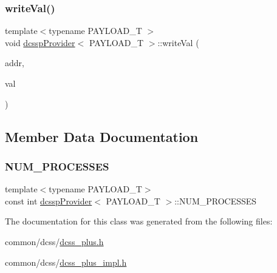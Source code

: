 \subsubsection{\texorpdfstring{write\+Val()}{writeVal()}}
{\footnotesize\ttfamily template$<$typename P\+A\+Y\+L\+O\+A\+D\+\_\+T $>$ \\
void \hyperlink{classdcsspProvider}{dcssp\+Provider}$<$ P\+A\+Y\+L\+O\+A\+D\+\_\+T $>$\+::write\+Val (\begin{DoxyParamCaption}\item[{\hyperlink{rq__unsafe_8h_ad45142aaf2ff20a036dc6242b8483e9c}{casword\+\_\+t} volatile $\ast$}]{addr,  }\item[{\hyperlink{rq__unsafe_8h_ad45142aaf2ff20a036dc6242b8483e9c}{casword\+\_\+t}}]{val }\end{DoxyParamCaption})}



\subsection{Member Data Documentation}
\mbox{\label{classdcsspProvider_a9ac60e159f73cc3e50fd85571b3c39a3}} 
\subsubsection{\texorpdfstring{N\+U\+M\+\_\+\+P\+R\+O\+C\+E\+S\+S\+ES}{NUM\_PROCESSES}}
{\footnotesize\ttfamily template$<$typename P\+A\+Y\+L\+O\+A\+D\+\_\+T$>$ \\
const int \hyperlink{classdcsspProvider}{dcssp\+Provider}$<$ P\+A\+Y\+L\+O\+A\+D\+\_\+T $>$\+::N\+U\+M\+\_\+\+P\+R\+O\+C\+E\+S\+S\+ES}



The documentation for this class was generated from the following files\+:\begin{DoxyCompactItemize}
\item 
common/dcss/\hyperlink{dcss__plus_8h}{dcss\+\_\+plus.\+h}\item 
common/dcss/\hyperlink{dcss__plus__impl_8h}{dcss\+\_\+plus\+\_\+impl.\+h}\end{DoxyCompactItemize}
